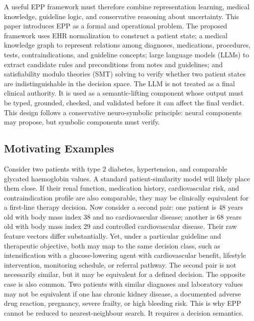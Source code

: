 \documentclass[english,5p,twocolumn,preprint]{elsarticle}
\begin{document}
A useful EPP framework must therefore combine representation learning, medical knowledge, guideline logic, and conservative reasoning about uncertainty. This paper introduces EPP as a formal and operational problem. The proposed framework uses EHR normalization to construct a patient state; a medical knowledge graph to represent relations among diagnoses, medications, procedures, tests, contraindications, and guideline concepts; large language models (LLMs) to extract candidate rules and preconditions from notes and guidelines; and satisfiability modulo theories (SMT) solving to verify whether two patient states are indistinguishable in the decision space. The LLM is not treated as a final clinical authority. It is used as a semantic-lifting component whose output must be typed, grounded, checked, and validated before it can affect the final verdict. This design follows a conservative neuro-symbolic principle: neural components may propose, but symbolic components must verify.

\subsection{Motivating Examples}
Consider two patients with type 2 diabetes, hypertension, and comparable glycated haemoglobin values. A standard patient-similarity model will likely place them close. If their renal function, medication history, cardiovascular risk, and contraindication profile are also comparable, they may be clinically equivalent for a first-line therapy decision. Now consider a second pair: one patient is 48 years old with body mass index 38 and no cardiovascular disease; another is 68 years old with body mass index 29 and controlled cardiovascular disease. Their raw feature vectors differ substantially. Yet, under a particular guideline and therapeutic objective, both may map to the same decision class, such as intensification with a glucose-lowering agent with cardiovascular benefit, lifestyle intervention, monitoring schedule, or referral pathway. The second pair is not necessarily similar, but it may be equivalent for a defined decision. The opposite case is also common. Two patients with similar diagnoses and laboratory values may not be equivalent if one has chronic kidney disease, a documented adverse drug reaction, pregnancy, severe frailty, or high bleeding risk. This is why EPP cannot be reduced to nearest-neighbour search. It requires a decision semantics.
\end{document}
